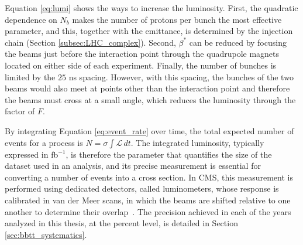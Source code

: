 Equation \ref{eq:lumi} shows the ways to increase the luminosity. First, the quadratic dependence on $N_b$ makes the number of protons per bunch the most effective parameter, and this, together with the emittance, is determined by the injection chain (Section \ref{subsec:LHC_complex}). Second, $\beta^*$ can be reduced by focusing the beams just before the interaction point through the quadrupole magnets located on either side of each experiment. Finally, the number of bunches is limited by the $25$ ns spacing. However, with this spacing, the bunches of the two beams would also meet at points other than the interaction point and therefore the beams must cross at a small angle, which reduces the luminosity through the factor of $F$.\medskip

By integrating Equation \ref{eq:event_rate} over time, the total expected number of events for a process is $N=\sigma\int\mathcal{L}\,dt$. The integrated luminosity, typically expressed in fb$^{-1}$, is therefore the parameter that quantifies the size of the dataset used in an analysis, and its precise measurement is essential for converting a number of events into a cross section. In CMS, this measurement is performed using dedicated detectors, called luminometers, whose response is calibrated in van der Meer scans, in which the beams are shifted relative to one another to determine their overlap~\cite{CMS:2021xjt}. The precision achieved in each of the years analyzed in this thesis, at the percent level, is detailed in Section \ref{sec:bbtt_systematics}.\medskip

